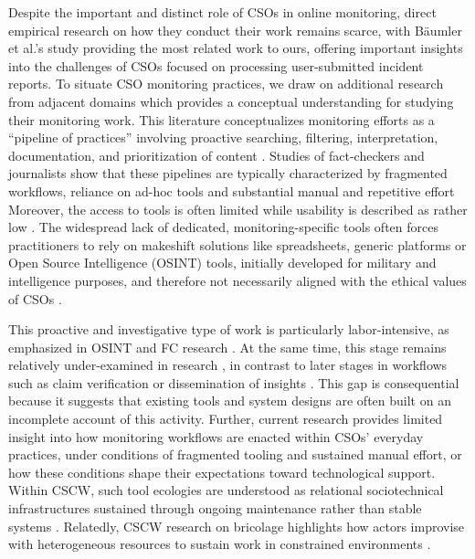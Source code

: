 \documentclass[acmsmall]{acmart}
\begin{document}
Despite the important and distinct role of CSOs in online monitoring, direct empirical research on how they conduct their work remains scarce, with Bäumler et al.'s study \cite{baumler_harnessing_2025} providing the most related work to ours, offering important insights into the challenges of CSOs focused on processing user-submitted incident reports. 
To situate CSO monitoring practices, we draw on additional research from adjacent domains which provides a conceptual understanding for studying their monitoring work. 
This literature conceptualizes monitoring efforts as a ``pipeline of practices'' \cite{micallef_true_2022} involving proactive searching, filtering, interpretation, documentation, and prioritization of content \cite{zachlod_social_2021,evangelista_systematic_2021}. 
Studies of fact-checkers and journalists show that these pipelines are typically characterized by fragmented workflows, reliance on ad-hoc tools and substantial manual and repetitive effort \cite{micallef_true_2022, juneja_human_2022, beers_examining_2020,nordis_report_2022, nordis_policy_2022} 
Moreover, the access to tools is often limited while usability is described as rather low \cite{baumler_harnessing_2025}. 
The widespread lack of dedicated, monitoring-specific tools often forces practitioners to rely on makeshift solutions like spreadsheets, generic platforms \cite{beers_examining_2020} or Open Source Intelligence (OSINT) tools, initially developed for military and intelligence purposes, and therefore not necessarily aligned with the ethical values of CSOs \cite{nordis_report_2022}.

This proactive and investigative type of work is particularly labor-intensive, as emphasized in OSINT \cite{decary-hetu_sifting_2015, glassman_intelligence_2012,evangelista_systematic_2021} and FC research \cite{juneja_human_2022,micallef_true_2022}. 
At the same time, this stage remains relatively under-examined in research \cite{hrckova_autonomation_2024}, in contrast to later stages in workflows such as claim verification \cite{hrckova_autonomation_2024,nakov_automated_2021} or dissemination of insights \cite{hrckova_autonomation_2024,skopik_osint_nlp_2024}. 
This gap is consequential because it suggests that existing tools and system designs are often built on an incomplete account of this activity.
Further, current research provides limited insight into how monitoring workflows are enacted within CSOs' everyday  practices, under conditions of fragmented tooling and sustained manual effort, or how these conditions shape their expectations toward technological support. Within CSCW, such tool ecologies are understood as relational sociotechnical infrastructures sustained through ongoing maintenance rather than stable systems \cite{star_steps_1994}. Relatedly, CSCW research on bricolage highlights how actors improvise with heterogeneous resources to sustain work in constrained environments \cite{buscher_landscapes_2001,karanasios_digital_2022}.
\end{document}
